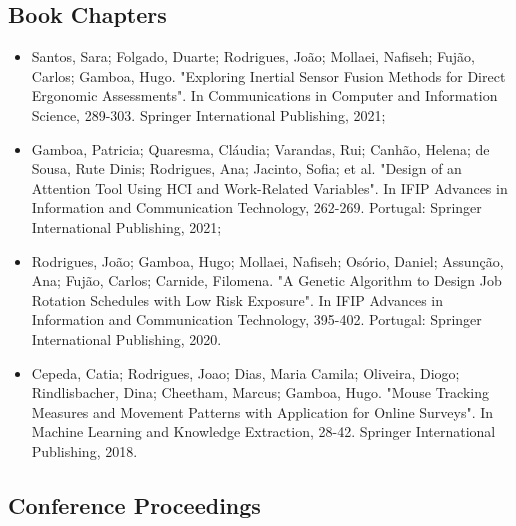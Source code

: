 \subsection{Book Chapters}

\begin{itemize}

\item Santos, Sara; Folgado, Duarte; Rodrigues, João; Mollaei, Nafiseh; Fujão, Carlos; Gamboa, Hugo. "Exploring Inertial Sensor Fusion Methods for Direct Ergonomic Assessments". In Communications in Computer and Information Science, 289-303. Springer International Publishing, 2021;

\item Gamboa, Patricia; Quaresma, Cláudia; Varandas, Rui; Canhão, Helena; de Sousa, Rute Dinis; Rodrigues, Ana; Jacinto, Sofia; et al. "Design of an Attention Tool Using HCI and Work-Related Variables". In IFIP Advances in Information and Communication Technology, 262-269. Portugal: Springer International Publishing, 2021;

\item Rodrigues, João; Gamboa, Hugo; Mollaei, Nafiseh; Osório, Daniel; Assunção, Ana; Fujão, Carlos; Carnide, Filomena. "A Genetic Algorithm to Design Job Rotation Schedules with Low Risk Exposure". In IFIP Advances in Information and Communication Technology, 395-402. Portugal: Springer International Publishing, 2020.

\item Cepeda, Catia; Rodrigues, Joao; Dias, Maria Camila; Oliveira, Diogo; Rindlisbacher, Dina; Cheetham, Marcus; Gamboa, Hugo. "Mouse Tracking Measures and Movement Patterns with Application for Online Surveys". In Machine Learning and Knowledge Extraction, 28-42. Springer International Publishing, 2018.

\end{itemize}


\subsection{Conference Proceedings}

